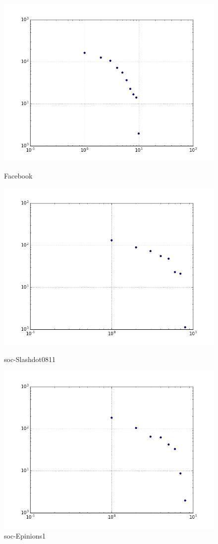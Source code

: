\begin{figure}[H]
  \includegraphics[width=\linewidth]{img/facebook/eig.png}
  \caption*{Facebook}
\endminipage\hfill
{}
  \includegraphics[width=\linewidth]{img/slashDot/eig.png}
  \caption*{soc-Slashdot0811}
\endminipage\hfill
{}
  \includegraphics[width=\linewidth]{img/soc-E/eig.png}
  \caption*{soc-Epinions1}
\endminipage
\end{figure}
